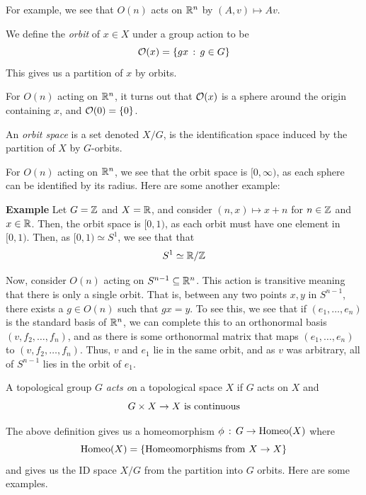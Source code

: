 For example, we see that $O(n)$ acts on $\R^n$ by $(A, v) \mapsto Av$.

\begin{definition}
    We define the \emph{orbit} of $x \in X$ under a group action to be
    \[ \cal{O}(x) = \{gx \col g \in G\} \]
    This gives us a partition of $x$ by orbits. 
\end{definition}

For $O(n)$ acting on $\R^n$, it turns out that $\cal{O}(x)$ is a sphere around the origin containing $x$, and $\cal{O}(0) = \{0\}$. 

\begin{definition}
    An \emph{orbit space} is a set denoted $X / G$, is the identification space induced by the partition of $X$ by $G$-orbits. 
\end{definition}

For $O(n)$ acting on $\R^n$, we see that the orbit space is $[0, \infty)$, as each sphere can be identified by its radius. Here are some another example:

\begin{example}{\textbf{Example}}
    Let $G = \Z$ and $X = \R$, and consider $(n, x) \mapsto x + n$ for $n \in \Z$ and $x \in \R$. Then, the orbit space is $[0, 1)$, as each orbit must have one element in $[0, 1)$. Then, as $[0, 1) \simeq S^1$, we see that that
    \[ S^1 \simeq \R / \Z \]

    Now, consider $O(n)$ acting on $S^{n - 1} \subseteq \R^n$. This action is transitive meaning that there is only a single orbit. That is, between any two points $x, y$ in $S^{n - 1}$, there exists a $g \in O(n)$ such that $gx = y$. To see this, we see that if $(e_1, \ldots, e_n)$ is the standard basis of $\R^n$, we can complete this to an orthonormal basis $(v, f_2, \ldots, f_n)$, and as there is some orthonormal matrix that maps $(e_1, \ldots, e_n)$ to $(v, f_2, \ldots, f_n)$. Thus, $v$ and $e_1$ lie in the same orbit, and as $v$ was arbitrary, all of $S^{n - 1}$ lies in the orbit of $e_1$. 
\end{example}

\begin{definition}
    A topological group $G$ \emph{acts o}n a topological space $X$ if $G$ acts on $X$ and
    \[ G \times X \to X \tt{ is continuous} \]
\end{definition}
The above definition gives us a homeomorphism $\phi \col G \to \tt{Homeo}(X)$ where
\[ \tt{Homeo}(X) = \{\tt{Homeomorphisms from } X \to X\} \]
and gives us the ID space $X / G$ from the partition into $G$ orbits. Here are some examples.

